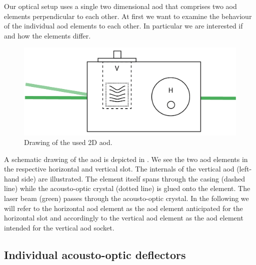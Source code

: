 Our optical setup uses a single two dimensional \gls{aod} that comprises two
\gls{aod} elements perpendicular to each other. At first we want to examine the
behaviour of the individual \gls{aod} elements to each other. In particular we
are interested if and how the elements differ.
\begin{figure}[htb]
  \centering
  \includegraphics[width=\textwidth]{../media/setup/aod-socket.png}
  \caption{Drawing of the used 2D \gls{aod}.
  }\label{fig:aod_socket}
\end{figure}
A schematic drawing of the \gls{aod} is depicted in . We
see the two \gls{aod} elements in the respective horizontal and vertical slot.
The internals of the vertical \gls{aod} (left-hand side) are illustrated. The
element itself spans through the casing (dashed line) while the acousto-optic
crystal (dotted line) is glued onto the element. The laser beam (green) passes
through the acousto-optic crystal. In the following we will refer to the
horizontal \gls{aod} element as the \gls{aod} element anticipated for the
horizontal slot and accordingly to the vertical \gls{aod} element as the
\gls{aod} element intended for the vertical \gls{aod} socket.

\subsection{Individual acousto-optic deflectors}

